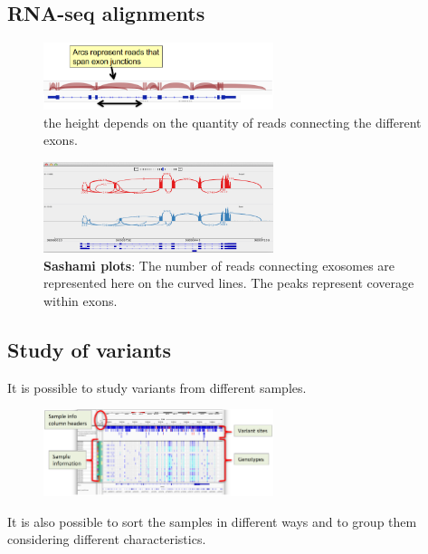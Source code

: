 \subsection{RNA-seq alignments}

\begin{figure}[H]
    \caption{the height depends on the quantity of reads connecting the different exons.}
    \centering
    \includegraphics[width=0.6\textwidth]{RNAseqAlign.PNG}
\end{figure}

\begin{figure}[H]
    \caption{\textbf{Sashami plots}: The number of reads connecting exosomes are
    represented here on the curved lines. The peaks represent coverage within
    exons.}
    \centering
    \includegraphics[width=0.6\textwidth]{sashamiplot.PNG}
\end{figure}

\subsection{Study of variants}
It is possible to study variants from different samples.

\begin{figure}[H]
    \centering
    \includegraphics[width=0.6\textwidth]{variantsView.PNG}
\end{figure}

It is also possible to sort the samples in different ways and to group them considering different characteristics.




